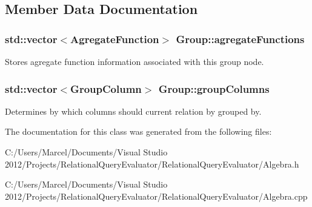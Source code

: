 \subsection{Member Data Documentation}
\hypertarget{class_group_afd02ca31d700990cddc2860d562635c2}{
\subsubsection[{agregate\+Functions}]{\setlength{\rightskip}{0pt plus 5cm}std\+::vector$<${\bf Agregate\+Function}$>$ Group\+::agregate\+Functions}}\label{class_group_afd02ca31d700990cddc2860d562635c2}
Stores agregate function information associated with this group node. \hypertarget{class_group_a811076e176eaa4e3bb8373b7bd515c7e}{
\subsubsection[{group\+Columns}]{\setlength{\rightskip}{0pt plus 5cm}std\+::vector$<${\bf Group\+Column}$>$ Group\+::group\+Columns}}\label{class_group_a811076e176eaa4e3bb8373b7bd515c7e}
Determines by which columns should current relation by grouped by. 

The documentation for this class was generated from the following files\+:\begin{DoxyCompactItemize}
\item 
C\+:/\+Users/\+Marcel/\+Documents/\+Visual Studio 2012/\+Projects/\+Relational\+Query\+Evaluator/\+Relational\+Query\+Evaluator/Algebra.\+h\item 
C\+:/\+Users/\+Marcel/\+Documents/\+Visual Studio 2012/\+Projects/\+Relational\+Query\+Evaluator/\+Relational\+Query\+Evaluator/Algebra.\+cpp\end{DoxyCompactItemize}

